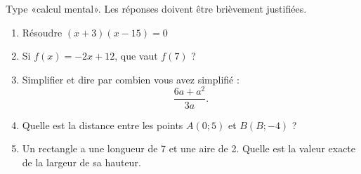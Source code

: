 
\begin{exercice}\label{exosmath-0601}

    Type «calcul mental». Les réponses doivent être brièvement justifiées.
    \begin{enumerate}
        \item
            Résoudre \( (x+3)(x-15)=0\)
        \item
            Si \( f(x)=-2x+12\), que vaut \( f(7)\) ?
        \item
            Simplifier et dire par combien vous avez simplifié :
            \begin{equation*}
                \frac{ 6a+a^2 }{ 3a }.
            \end{equation*}
        \item
            Quelle est la distance entre les points \( A(0;5)\) et \( B(B;-4)\) ?
        \item
            Un rectangle a une longueur de \unit{7}{\centi\meter} et une aire de \unit{2}{\centi\meter\squared}. Quelle est la valeur exacte de la largeur de sa hauteur.
    \end{enumerate}

\end{exercice}
